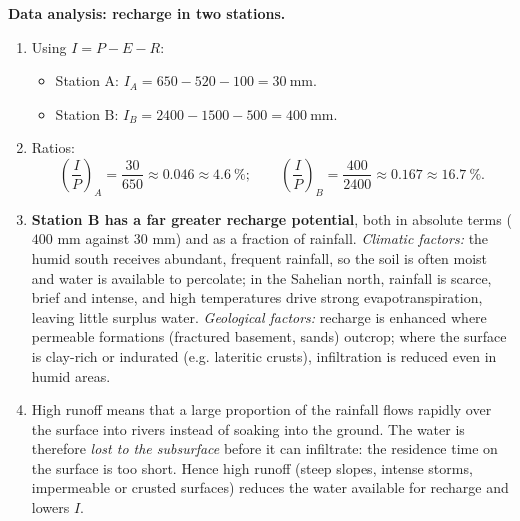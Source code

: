 \documentclass[11pt]{article}
\begin{document}
\begin{corrige}[Exercise 5]
\textbf{Data analysis: recharge in two stations.}
\begin{enumerate}
\item Using $I = P - E - R$:
\begin{itemize}
\item Station A: $I_A = 650 - 520 - 100 = 30\ \mathrm{mm}$.
\item Station B: $I_B = 2400 - 1500 - 500 = 400\ \mathrm{mm}$.
\end{itemize}
\item Ratios:
\[ \left(\frac{I}{P}\right)_A = \frac{30}{650} \approx 0.046 \approx 4.6\ \%; \qquad \left(\frac{I}{P}\right)_B = \frac{400}{2400} \approx 0.167 \approx 16.7\ \%. \]
\item \textbf{Station B has a far greater recharge potential}, both in absolute terms ($400$ mm against $30$ mm) and as a fraction of rainfall. \emph{Climatic factors:} the humid south receives abundant, frequent rainfall, so the soil is often moist and water is available to percolate; in the Sahelian north, rainfall is scarce, brief and intense, and high temperatures drive strong evapotranspiration, leaving little surplus water. \emph{Geological factors:} recharge is enhanced where permeable formations (fractured basement, sands) outcrop; where the surface is clay-rich or indurated (e.g. lateritic crusts), infiltration is reduced even in humid areas.
\item High runoff means that a large proportion of the rainfall flows rapidly over the surface into rivers instead of soaking into the ground. The water is therefore \emph{lost to the subsurface} before it can infiltrate: the residence time on the surface is too short. Hence high runoff (steep slopes, intense storms, impermeable or crusted surfaces) reduces the water available for recharge and lowers $I$.
\end{enumerate}
\end{corrige}
\end{document}
